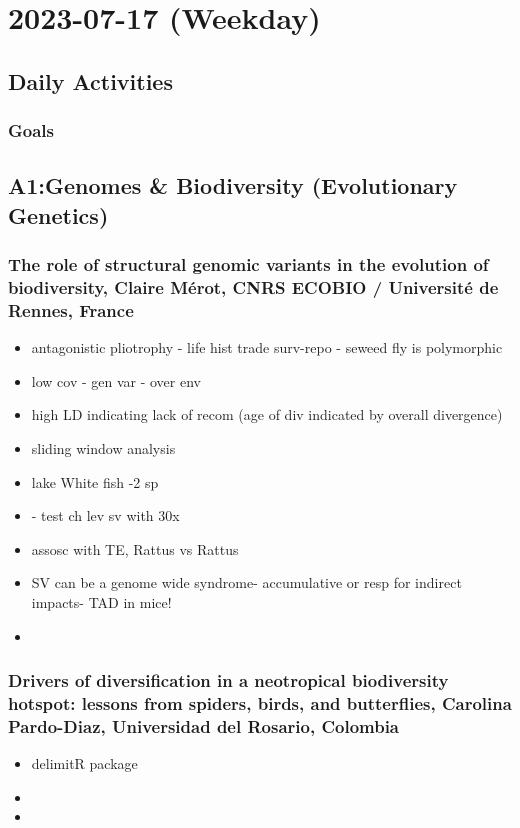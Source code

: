 \documentclass[document.tex]{subfiles}
\begin{document}
\chapter{2023-07-17 (Weekday)}
\label{day:2023-07-17}
\section*{Daily Activities}
\subsection*{Goals}


\section{A1:Genomes & Biodiversity (Evolutionary Genetics)}
    
        \subsection{The role of structural genomic variants in the evolution of biodiversity, Claire Mérot, CNRS ECOBIO / Université de Rennes, France}
        \begin{itemize}
        \item antagonistic pliotrophy - life hist trade surv-repo - seweed fly is polymorphic
        \item  low cov - gen var - over env 
        \item high LD indicating lack of recom (age of div indicated by overall divergence) 
        \item sliding window analysis
        \item lake White fish -2 sp
        \item - test ch lev sv with 30x
        \item assosc with TE, Rattus vs Rattus
        \item SV can be a genome wide syndrome- accumulative or resp for indirect impacts- TAD in mice!
        \item  
        \end{itemize}

        \subsection{Drivers of diversification in a neotropical biodiversity hotspot: lessons from spiders, birds, and butterflies, Carolina Pardo-Diaz, Universidad del Rosario, Colombia}
        \begin{itemize}
        \item delimitR package
        \item 
        \item 
        \end{itemize}
\end{document}
